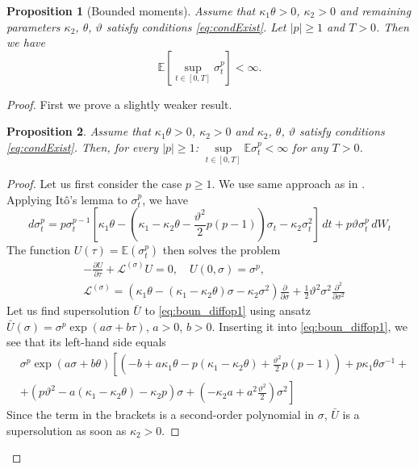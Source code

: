 \documentclass[pdftex,11pt,a4paper] {article}
\newtheorem{proposition}{Proposition}[section]
\begin{document}
\begin{proposition}[Bounded moments]\label{prop:bound_moms}
Assume that $\kappa_1\theta>0$, $\kappa_2>0$ and  remaining parameters $\kappa_2$, $\theta$, $\vartheta$ satisfy conditions \eqref{eq:condExist}. Let $|p|\ge 1$ and $T>0$. Then we have
\begin{equation*}
\mathbb{E}\left[\sup_{t\in[0,T]}\sigma_t^p\right]<\infty.
\end{equation*}
\end{proposition}
\begin{proof}
First we prove a slightly weaker result. 
\begin{proposition}\label{prop:unif_bounded_mom1}
Assume that $\kappa_1\theta>0$, $\kappa_2>0$ and  $\kappa_2$, $\theta$, $\vartheta$ satisfy conditions \eqref{eq:condExist}. Then, for every $|p|\ge 1$:  $\sup\limits_{t\in[0,T]}\mathbb{E}\sigma_t^p<\infty$ for any $T>0$.
\end{proposition}
\begin{proof}
Let us first consider  the case $p\ge 1$. We use same approach as in \cite{Lions2007}. Applying It\^{o}'s lemma to $\sigma_t^p$, we have
\begin{equation*}
d\sigma_t^p=p\sigma_t^{p-1}\left[\kappa_1\theta-\left(\kappa_1-\kappa_2\theta-\frac{\vartheta^2}{2}p(p-1)\right)\sigma_t-\kappa_2\sigma_t^{2}\right]\,dt+p\vartheta\sigma_t^p\,dW_t
\end{equation*}
The function $U(\tau)=\mathbb{E}(\sigma_t^p)$ then solves the problem
\begin{equation}\label{eq:boun_diffop1}
\begin{split}
&-\frac{\partial U}{\partial \tau}+\mathcal{L}^{(\sigma)}U=0,\quad  U(0,\sigma)=\sigma^p,\\
&\mathcal{L}^{(\sigma)}=\left(\kappa_1\theta - (\kappa_1-\kappa_2\theta)\sigma-\kappa_2\sigma^2\right)\frac{\partial}{\partial \sigma}+\frac 12\vartheta^2\sigma^2\frac{\partial^2}{\partial \sigma^2}
\end{split}
\end{equation}
Let us find supersolution $\bar U$ to \eqref{eq:boun_diffop1} using ansatz $\bar U(\sigma)=\sigma^p\exp\left(a\sigma+b\tau\right)$,  $a> 0$, $b> 0$. Inserting it into \eqref{eq:boun_diffop1}, we see that its left-hand side equals
\begin{equation*}
\begin{split}
&\sigma^p\exp(a\sigma+b\theta)\left[\left(-b+a\kappa_1\theta-p(\kappa_1-\kappa_2\theta)+\frac{\vartheta^2}{2}p(p-1)\right)+p\kappa_1\theta\sigma^{-1}+\right.\\
&+\left.\left(p\vartheta^2-a(\kappa_1-\kappa_2\theta)-\kappa_2p\right)\sigma+\left(-\kappa_2a+a^2\frac{\vartheta^2}{2}\right)\sigma^2\right]
\end{split}
\end{equation*}
Since the term in the brackets is a second-order polynomial in $\sigma$, $\bar U$ is a supersolution as soon as $\kappa_2>0$. 


\end{proof}
\end{proof}
\end{document}
